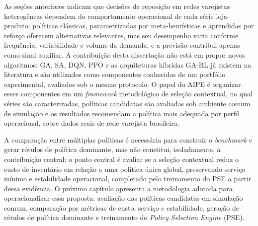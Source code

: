 As seções anteriores indicam que decisões de reposição em redes varejistas heterogêneas dependem do comportamento operacional de cada série loja-produto: políticas clássicas, parametrizadas por meta-heurísticas e aprendidas por reforço oferecem alternativas relevantes, mas seu desempenho varia conforme frequência, variabilidade e volume da demanda, e a previsão contribui apenas como sinal auxiliar. A contribuição desta dissertação não está em propor novos algoritmos: GA, SA, DQN, PPO e as arquiteturas híbridas GA-RL já existem na literatura e são utilizados como componentes conhecidos de um portfólio experimental, avaliados sob o mesmo protocolo. O papel do AIPE é organizar esses componentes em um \textit{framework} metodológico de seleção contextual, no qual séries são caracterizadas, políticas candidatas são avaliadas sob ambiente comum de simulação e os resultados recomendam a política mais adequada por perfil operacional, sobre dados reais de rede varejista brasileira.

A comparação entre múltiplas políticas é necessária para construir o \textit{benchmark} e gerar rótulos de política dominante, mas não constitui, isoladamente, a contribuição central: o ponto central é avaliar se a seleção contextual reduz o custo de inventário em relação a uma política única global, preservando serviço mínimo e estabilidade operacional, completado pelo treinamento do PSE a partir dessa evidência. O próximo capítulo apresenta a metodologia adotada para operacionalizar essa proposta: avaliação das políticas candidatas em simulação comum, comparação por métricas de custo, serviço e estabilidade, geração de rótulos de política dominante e treinamento do \textit{Policy Selection Engine} (PSE).

